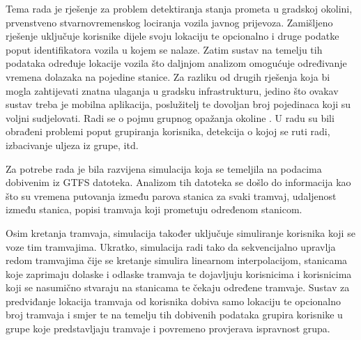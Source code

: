 \documentclass[times, utf8, diplomski]{fer}
\begin{document}
\begin{sazetak}
Tema rada je rješenje za problem detektiranja stanja prometa u gradskoj okolini, prvenstveno stvarnovremenskog lociranja vozila javnog prijevoza. Zamišljeno rješenje uključuje korisnike dijele svoju lokaciju te opcionalno i druge podatke poput identifikatora vozila u kojem se nalaze. Zatim sustav na temelju tih podataka određuje lokacije vozila što daljnjom analizom omogućuje određivanje vremena dolazaka na pojedine stanice. Za razliku od drugih rješenja koja bi mogla zahtijevati znatna ulaganja u gradsku infrastrukturu, jedino što ovakav sustav treba je mobilna aplikacija, poslužitelj te dovoljan broj pojedinaca koji su voljni sudjelovati. Radi se o pojmu grupnog opažanja okoline . U radu su bili obrađeni problemi poput grupiranja korisnika, detekcija o kojoj se ruti radi, izbacivanje uljeza  iz grupe, itd. 

Za potrebe rada je bila razvijena simulacija koja se temeljila na podacima dobivenim iz GTFS datoteka. Analizom tih datoteka se došlo do informacija kao što su vremena putovanja između parova stanica za svaki tramvaj, udaljenost između stanica, popisi tramvaja koji prometuju određenom stanicom.

Osim kretanja tramvaja, simulacija također uključuje simuliranje korisnika koji se voze tim tramvajima. Ukratko, simulacija radi tako da sekvencijalno upravlja redom tramvajima čije se kretanje simulira linearnom interpolacijom, stanicama koje zaprimaju dolaske i odlaske tramvaja te dojavljuju korisnicima i korisnicima koji se nasumično stvaraju na stanicama te čekaju određene tramvaje. Sustav za predviđanje lokacija tramvaja od korisnika dobiva samo lokaciju te opcionalno broj tramvaja i smjer te na temelju tih dobivenih podataka grupira korisnike u grupe koje predstavljaju tramvaje i povremeno provjerava ispravnost grupa. 

\end{sazetak}
\end{document}
